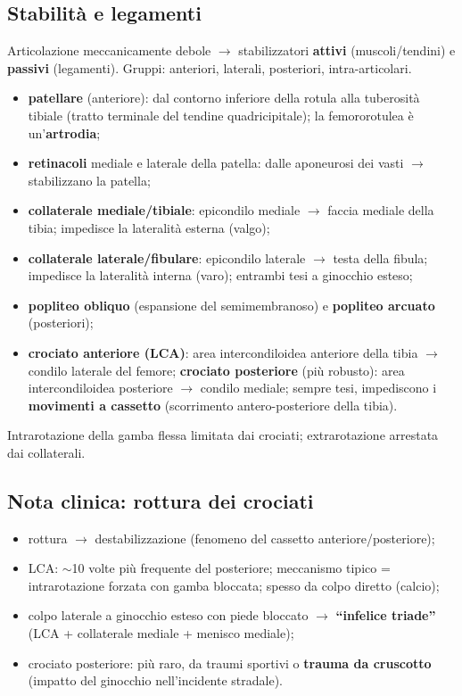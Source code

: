\subsection{Stabilità e legamenti}
Articolazione meccanicamente debole $\rightarrow$ stabilizzatori \textbf{attivi} (muscoli/tendini) e
\textbf{passivi} (legamenti). Gruppi: anteriori, laterali, posteriori, intra-articolari.
\begin{itemize}
  \item \textbf{patellare} (anteriore): dal contorno inferiore della rotula alla tuberosità tibiale
    (tratto terminale del tendine quadricipitale); la femororotulea è un'\textbf{artrodia};
  \item \textbf{retinacoli} mediale e laterale della patella: dalle aponeurosi dei vasti $\rightarrow$
    stabilizzano la patella;
  \item \textbf{collaterale mediale/tibiale}: epicondilo mediale $\rightarrow$ faccia mediale della
    tibia; impedisce la lateralità esterna (valgo);
  \item \textbf{collaterale laterale/fibulare}: epicondilo laterale $\rightarrow$ testa della fibula;
    impedisce la lateralità interna (varo); entrambi tesi a ginocchio esteso;
  \item \textbf{popliteo obliquo} (espansione del semimembranoso) e \textbf{popliteo arcuato}
    (posteriori);
  \item \textbf{crociato anteriore (LCA)}: area intercondiloidea anteriore della tibia $\rightarrow$
    condilo laterale del femore; \textbf{crociato posteriore} (più robusto): area intercondiloidea
    posteriore $\rightarrow$ condilo mediale; sempre tesi, impediscono i \textbf{movimenti a cassetto}
    (scorrimento antero-posteriore della tibia).
\end{itemize}
Intrarotazione della gamba flessa limitata dai crociati; extrarotazione arrestata dai collaterali.

\subsection{Nota clinica: rottura dei crociati}
\begin{itemize}
  \item rottura $\rightarrow$ destabilizzazione (fenomeno del cassetto anteriore/posteriore);
  \item LCA: $\sim$10 volte più frequente del posteriore; meccanismo tipico = intrarotazione forzata
    con gamba bloccata; spesso da colpo diretto (calcio);
  \item colpo laterale a ginocchio esteso con piede bloccato $\rightarrow$ \textbf{``infelice
    triade''} (LCA + collaterale mediale + menisco mediale);
  \item crociato posteriore: più raro, da traumi sportivi o \textbf{trauma da cruscotto} (impatto del
    ginocchio nell'incidente stradale).
\end{itemize}

